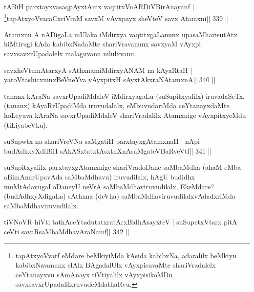\begin{shl}
tABiH parxtayxvasaqpAyx\s\s tAmx vaqtitxVnARDiVBirAnayanf |
\footnote{tapAtxyoVvatf eMdare beMkiyiMda kAsida kabibxNa, adaralilx beMkiyu kabibxNavanunx elAlx BAgadalUlx vAyxpisuvaMte  shariVradalelx ceYtanayxvu sAmAnayx riVtiyalilx vAyxpisikoMDu  savxsavxrUpadalilxruvudeMdathaRvu.}tapAtxyoVvacaCxriVraM savxM vAyxpayx sheVteV savx Atamxni\hfill || 339 ||
\end{shl}

\begin{artha}
Atamxnu A nADigaLa mUlaka iMdirxya vaqtitxgaLanunx upasaMharisutAtx  hiMtirugi kAda kabibxNadaMte shariVravanunx savxyaM vAyxpi savxsavxrUpadalelx malaguvanu nilulxvanu.
\end{artha}


\begin{shl}
savxheVtumAtarxyA sAthxnamiMdirxyANAM na kAyaRtaH |
yatoV\s tashicxninxBeVneYva vAyxpitxH sAyxtAkxraNAtamxnA\hfill || 340 ||
\end{shl}

\begin{artha}
tananx kAraNa savxrUpadiMdaleV iMdirxyagaLu (suSupitxyalilx)  iruvadaSeTx, (tananx) kAyaRrUpadiMda iruvudalalx, eMbuvudariMda ceYtanayxdaMte hoLeyuva kAraNa savxrUpadiMdaleV shariVradalilx Atamxnige vAyxpitxyeMdu (tiLiyabeVku).
\end{artha}


\begin{shl}
suSupwtx na shariVreVNa saMgatiH parxtayxgAtamxnaH |
nApi budAdhxyXdiBiH sAkASxtatxtAsxthXnAsaMgateVBaRveVtf\hfill || 341 ||
\end{shl}

\begin{artha}
suSupitxyalilx parxtayxgAtamxnige shariVradoDane saMbaMdha (ahaM eMba  aBimAnarUpavAda saMbaMdhavu) iruvudilalx, hAgU budidhx  muMtAdavugaLoDaneyU neVrA saMbaMdhaviruvudilalx, EkeMdare? (budAdhxyXdigaLa) sAthxna (deVha) saMbaMdhaviruvudilalxvAdadxriMda saMbaMdhaviruvudilalx.
\end{artha}


\begin{shl}
tiVNoVR hiVti tathAceYtadutatxratArxBidhAsayxteV |
suSupetxV\s tarx pitA ceVti savaRsaMbaMdhavAraNamf\hfill || 342 ||
\end{shl}

